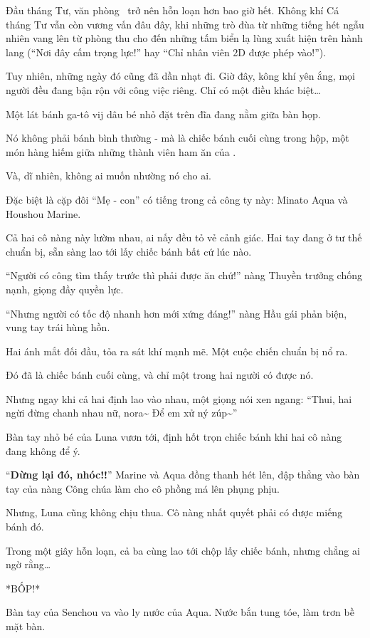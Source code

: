 \documentclass[../main.tex]{subfiles}
\begin{document}
Đầu tháng Tư, văn phòng \hll\ trở nên hỗn loạn hơn bao giờ hết. Không khí Cá tháng Tư vẫn còn vương vấn đâu đây, khi những trò đùa từ những tiếng hét ngẫu nhiên vang lên từ phòng thu cho đến những tấm biển lạ lùng xuất hiện trên hành lang (``Nơi đây cấm trọng lực!'' hay ``Chỉ nhân viên 2D được phép vào!'').

Tuy nhiên, những ngày đó cũng đã dần nhạt đi. Giờ đây, kông khí yên ắng, mọi người đều đang bận rộn với công việc riêng. Chỉ có một điều khác biệt\dots

Một lát bánh ga-tô vij dâu bé nhỏ đặt trên đĩa đang nằm giữa bàn họp.

Nó không phải bánh bình thường - mà là chiếc bánh cuối cùng trong hộp, một món hàng hiếm giữa những thành viên ham ăn của \hll.

Và, dĩ nhiên, không ai muốn nhường nó cho ai.

Đặc biệt là cặp đôi ``Mẹ - con'' có tiếng trong cả công ty này: Minato Aqua và Houshou Marine.

Cả hai cô nàng này lườm nhau, ai nấy đều tỏ vẻ cảnh giác. Hai tay đang ở tư thế chuẩn bị, sẵn sàng lao tới lấy chiếc bánh bất cứ lúc nào.

``Người có công tìm thấy trước thì phải được ăn chứ!'' nàng Thuyền trưởng chống nạnh, giọng đầy quyền lực.

``Nhưng người có tốc độ nhanh hơn mới xứng đáng!'' nàng Hầu gái phản biện, vung tay trái hùng hồn.

Hai ánh mắt đối đầu, tỏa ra sát khí mạnh mẽ. Một cuộc chiến chuẩn bị nổ ra.

Đó đã là chiếc bánh cuối cùng, và chỉ một trong hai người có được nó.

Nhưng ngay khi cả hai định lao vào nhau, một giọng nói xen ngang: ``Thui, hai ngừi đừng chanh nhau nữ, nora\~{} Để em xử ný zúp\~{}''

Bàn tay nhỏ bé của Luna vươn tới, định hốt trọn chiếc bánh khi hai cô nàng đang không để ý.

``\textbf{Dừng lại đó, nhóc!!}'' Marine và Aqua đồng thanh hét lên, đập thẳng vào bàn tay của nàng Công chúa làm cho cô phồng má lên phụng phịu.

Nhưng, Luna cũng không chịu thua. Cô nàng nhất quyết phải có được miếng bánh đó.

Trong một giây hỗn loạn, cả ba cùng lao tới chộp lấy chiếc bánh, nhưng chẳng ai ngờ rằng\dots

*BỐP!*

Bàn tay của Senchou va vào ly nước của Aqua. Nước bắn tung tóe, làm trơn bề mặt bàn.
\end{document}
